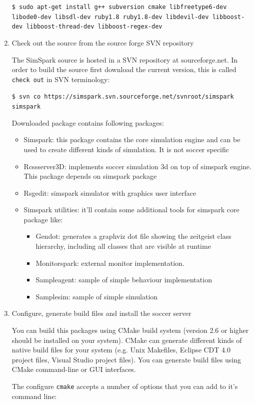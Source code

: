 \begin{enumerate}
\texttt{\$ sudo apt-get install g++ subversion cmake libfreetype6-dev libode0-dev libsdl-dev ruby1.8 ruby1.8-dev libdevil-dev libboost-dev libboost-thread-dev libboost-regex-dev}

\item Check out the source from the source forge SVN repository

The SimSpark source is hosted in a SVN repository at
sourceforge.net. In order to build the source first download the
current version, this is called \texttt{check out} in SVN terminology:

\texttt{\$ svn co https://simspark.svn.sourceforge.net/svnroot/simspark simspark}

Downloaded package contains following packages:
\begin{itemize}
\item Simspark: this package contains the core simulation engine and
can be used to create different kinds of simulation. It is not soccer
specific
\item Rcssserver3D: implements soccer simulation 3d on top of simspark
engine. This package depends on simspark package
\item Rsgedit: simspark simulator with graphics user interface
\item Simspark utilities: it'll contain some additional tools for
simspark core package like:
\begin{itemize}
\item Gendot: generates a graphviz dot file showing the zeitgeist class hierarchy, including all classes that are visible at runtime
\item Monitorspark: external monitor implementation.
\item Sampleagent: sample of simple behaviour implementation
\item Samplesim: sample of simple simulation
\end{itemize}
\end{itemize}

\item Configure, generate build files and install the soccer server

You can build this packages using CMake build system (version 2.6 or higher
should be installed on your system). CMake can generate different kinds of
native build files for your system (e.g. Unix Makefiles, Eclipse CDT 4.0 project
files, Visual Studio project files). You can generate build files using CMake
command-line or GUI interfaces.

The configure \texttt{cmake} accepts a number of options that you can add to it's
command line:


\end{enumerate}
